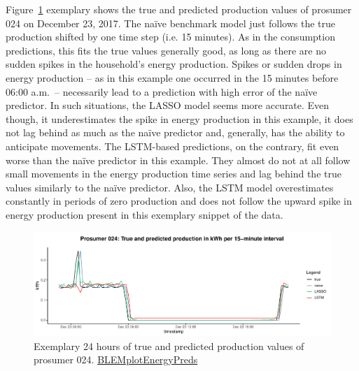 Figure~\ref{Fig:glimpse_predprod} exemplary shows the true and predicted production values of prosumer 024 on December 23, 2017. The na\"ive benchmark model just follows the true production shifted by one time step (i.e. 15 minutes). As in the consumption predictions, this fits the true values generally good, as long as there are no sudden spikes in the household's energy production. Spikes or sudden drops in energy production -- as in this example one occurred in the 15 minutes before 06:00 a.m.~-- necessarily lead to a prediction with high error of the na\"ive predictor. In such situations, the LASSO model seems more accurate. Even though, it underestimates the spike in energy production in this example, it does not lag behind as much as the na\"ive predictor and, generally, has the ability to anticipate movements. The LSTM-based predictions, on the contrary, fit even worse than the na\"ive predictor in this example. They almost do not at all follow small movements in the energy production time series and lag behind the true values similarly to the na\"ive predictor. Also, the LSTM model overestimates constantly in periods of zero production and does not follow the upward spike in energy production present in this exemplary snippet of the data.
%
\begin{figure}[htbp]
    \centering
    \includegraphics[width=\textwidth]{thesis/graphs/evaluation/p024_pred_prod.pdf}
    \caption[Exemplary 24 hours of true and predicted production values]{Exemplary 24 hours of true and predicted production values of prosumer 024. \quantnet\href{https://github.com/QuantLet/BLEM/tree/master/BLEMplotEnergyPreds}{BLEMplotEnergyPreds}}
    \label{Fig:glimpse_predprod}
\end{figure}
%

